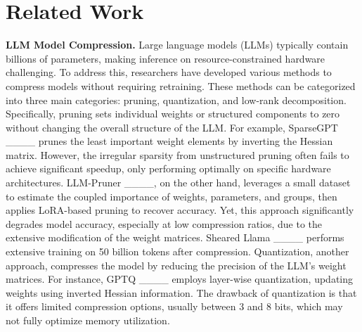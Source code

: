 \section{Related Work}
\label{sec_appn_relatedWork}
\textbf{LLM Model Compression.}
Large language models (LLMs) typically contain billions of parameters, making inference on resource-constrained hardware challenging. To address this, researchers have developed various methods to compress models without requiring retraining. These methods can be categorized into three main categories: pruning, quantization, and low-rank decomposition. Specifically, pruning sets individual weights or structured components to zero without changing the overall structure of the LLM. For example, SparseGPT ____ prunes the least important weight elements by inverting the Hessian matrix. However, the irregular sparsity from unstructured pruning often fails to achieve significant speedup, only performing optimally on specific hardware architectures. LLM-Pruner ____, on the other hand, leverages a small dataset to estimate the coupled importance of weights, parameters, and groups, then applies LoRA-based pruning to recover accuracy. Yet, this approach significantly degrades model accuracy, especially at low compression ratios, due to the extensive modification of the weight matrices.  Sheared Llama ____ performs extensive training on 50 billion tokens after compression.
Quantization, another approach, compresses the model by reducing the precision of the LLM’s weight matrices. For instance, GPTQ ____ employs layer-wise quantization, updating weights using inverted Hessian information. The drawback of quantization is that it offers limited compression options, usually between 3 and 8 bits, which may not fully optimize memory utilization.


